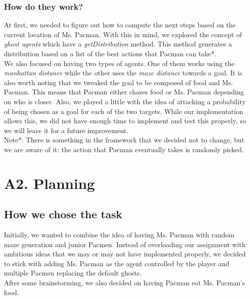 \documentclass[a4paper,12pt]{report}
\begin{document}
\subsection{How do they work?}
At first, we needed to figure out how to compute the next steps based on the current location of Ms. Pacman.
With this in mind, we explored the concept of \emph{ghost agents} which have a \emph{getDistribution} method.
This method generates a distribution based on a list of the best actions that Pacman can take*.\\
We also focused on having two types of agents. One of them works using the \emph{manhattan distance} while the other uses the \emph{maze distance} towards a goal.
It is also worth noting that we tweaked the goal to be composed of food and Ms. Pacman. This means that Pacman either chases
food or Ms. Pacman depending on who is closer. Also, we played a little with the idea of attaching a probability of being chosen
as a goal for each of the two targets. While our implementation allows this, we did not have enough time to implement
and test this properly, so we will leave it for a future improvement.\\
Note*: There is something in the framework that we decided not to change, but we are aware of it: the action that
Pacman eventually takes is randomly picked.
\chapter{A2. Planning}
\section{How we chose the task}
Initially, we wanted to combine the idea of having Ms. Pacman with random maze generation and junior Pacmen.
Instead of overloading our assignment with ambitious ideas that we may or may not have implemented properly,
we decided to stick with adding Ms. Pacman as the agent controlled by the player and multiple Pacmen replacing
the default ghosts.\\
After some brainstorming, we also decided on having Pacman eat Ms. Pacman's food.
\end{document}

